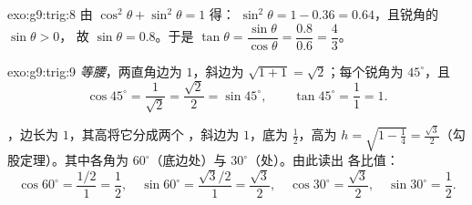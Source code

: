\begin{solution}{exo:g9:trig:8}
由 $\cos^2\theta + \sin^2\theta = 1$ 得：
$\sin^2\theta = 1 - 0.36 = 0.64$，且锐角的 $\sin\theta > 0$，
故 $\sin\theta = 0.8$。于是
$\tan\theta = \dfrac{\sin\theta}{\cos\theta} = \dfrac{0.8}{0.6} =
\dfrac43$。
\end{solution}

\begin{solution}{exo:g9:trig:9}
\emph{等腰}，两直角边为 $1$，斜边为
$\sqrt{1 + 1} = \sqrt2$；每个锐角为 $45^\circ$，且
\[
\cos 45^\circ = \frac{1}{\sqrt2} = \frac{\sqrt2}{2} = \sin 45^\circ,
\qquad
\tan 45^\circ = \frac11 = 1 .
\]

\emph{}，边长为 $1$，其高将它分成两个
，斜边为 $1$，底为 $\frac12$，高为
$h = \sqrt{1 - \frac14} = \frac{\sqrt3}{2}$（勾股定理）。其中各角为
$60^\circ$（底边处）与 $30^\circ$（处）。由此读出
各比值：
\[
\cos 60^\circ = \frac{1/2}{1} = \frac12, \quad
\sin 60^\circ = \frac{\sqrt3/2}{1} = \frac{\sqrt3}{2}, \quad
\cos 30^\circ = \frac{\sqrt3}{2}, \quad
\sin 30^\circ = \frac12 .
\]
\end{solution}

